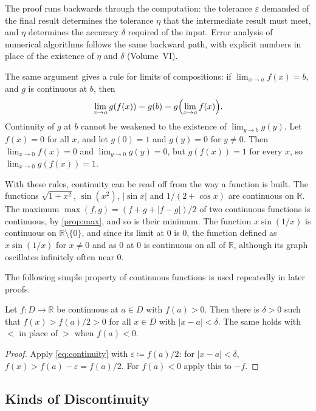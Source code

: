 The proof runs backwards through the computation: the tolerance $\varepsilon$ demanded of the final result determines the tolerance $\eta$ that the intermediate result must meet, and $\eta$ determines the accuracy $\delta$ required of the input. Error analysis of numerical algorithms follows the same backward path, with explicit numbers in place of the existence of $\eta$ and $\delta$ (Volume~VI).

The same argument gives a rule for limits of compositions: if $\lim_{x\to a}f(x)=b$, and $g$ is continuous at $b$, then
\begin{equation}
\lim_{x\to a}g(f(x))=g(b)=g\Bigl(\lim_{x\to a}f(x)\Bigr).
\label{eq:limit-composition}
\end{equation}
Continuity of $g$ at $b$ cannot be weakened to the existence of $\lim_{y\to b}g(y)$. Let $f(x)=0$ for all $x$, and let $g(0)=1$ and $g(y)=0$ for $y\ne0$. Then $\lim_{x\to0}f(x)=0$ and $\lim_{y\to0}g(y)=0$, but $g(f(x))=1$ for every $x$, so $\lim_{x\to0}g(f(x))=1$.

With these rules, continuity can be read off from the way a function is built. The functions $\sqrt{1+x^2}$, $\sin(x^2)$, $|\sin x|$ and $1/(2+\cos x)$ are continuous on $\mathbb R$. The maximum $\max(f,g)=(f+g+|f-g|)/2$ of two continuous functions is continuous, by \cref{prop:max}, and so is their minimum. The function $x\sin(1/x)$ is continuous on $\mathbb R\setminus\{0\}$, and since its limit at $0$ is $0$, the function defined as $x\sin(1/x)$ for $x\ne0$ and as $0$ at $0$ is continuous on all of $\mathbb R$, although its graph oscillates infinitely often near $0$.

The following simple property of continuous functions is used repeatedly in later proofs.

\begin{lemma}
\label{lem:sign-persistence}
Let $f\colon D\to\mathbb R$ be continuous at $a\in D$ with $f(a)>0$. Then there is $\delta>0$ such that $f(x)>f(a)/2>0$ for all $x\in D$ with $|x-a|<\delta$. The same holds with $<$ in place of $>$ when $f(a)<0$.
\end{lemma}

\begin{proof}
Apply \eqref{eq:continuity} with $\varepsilon\coloneqq f(a)/2$: for $|x-a|<\delta$, $f(x)>f(a)-\varepsilon=f(a)/2$. For $f(a)<0$ apply this to $-f$.
\end{proof}

\subsection{Kinds of Discontinuity}

